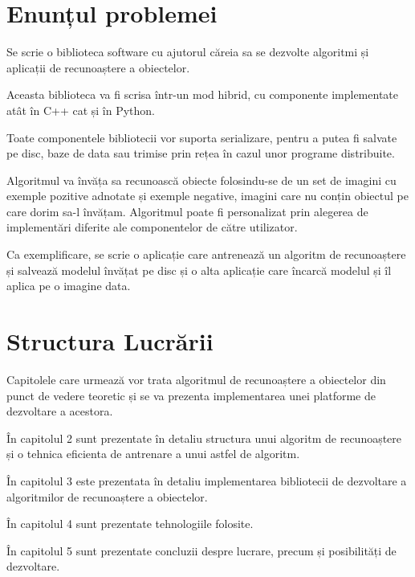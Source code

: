 






\section{Enunțul problemei}
Se scrie o biblioteca software cu ajutorul căreia sa se dezvolte algoritmi și aplicații de recunoaștere a obiectelor.

Aceasta biblioteca va fi scrisa într-un mod hibrid, cu componente implementate atât în C++ cat și în Python.

Toate componentele bibliotecii vor suporta serializare, pentru a putea fi salvate pe disc, baze de data sau trimise prin rețea în cazul unor programe distribuite.

Algoritmul va învăța sa recunoască obiecte folosindu-se de un set de imagini cu exemple pozitive adnotate și exemple negative, imagini care nu conțin obiectul pe care dorim sa-l învățam.
Algoritmul poate fi personalizat prin alegerea de implementări diferite ale componentelor de către utilizator.

Ca exemplificare, se scrie o aplicație care antrenează un algoritm de recunoaștere și salvează modelul învățat pe disc și o alta aplicație care încarcă modelul și îl aplica pe o imagine data.



\section{Structura Lucrării}
Capitolele care urmează vor trata algoritmul de recunoaștere a obiectelor din punct de vedere teoretic și se va prezenta implementarea unei platforme de dezvoltare a acestora.

În capitolul 2 sunt prezentate în detaliu structura unui algoritm de recunoaștere și o tehnica eficienta de antrenare a unui astfel de algoritm.

În capitolul 3 este prezentata în detaliu implementarea bibliotecii de dezvoltare a algoritmilor de recunoaștere a obiectelor.

În capitolul 4 sunt prezentate tehnologiile folosite.

În capitolul 5 sunt prezentate concluzii despre lucrare, precum și posibilități de dezvoltare.

\pagebreak